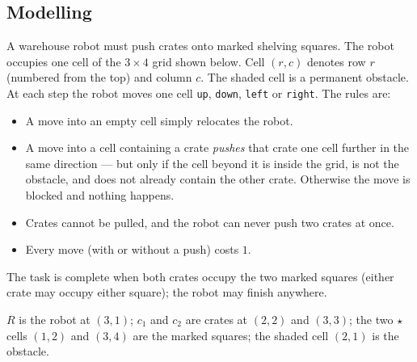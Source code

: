 \subsection{\points[10] Modelling}
A warehouse robot must push crates onto marked shelving squares.
The robot occupies one cell of the $3 \times 4$ grid shown below.
Cell $(r,c)$ denotes row $r$ (numbered from the top) and column $c$.
The shaded cell is a permanent obstacle.
\medskip\noindent
At each step the robot moves one cell \texttt{up}, \texttt{down}, \texttt{left} or \texttt{right}.
The rules are:
\begin{itemize}
  \item A move into an empty cell simply relocates the robot.
  \item A move into a cell containing a crate \emph{pushes} that crate one cell further in the
        same direction --- but only if the cell beyond it is inside the grid, is not the
        obstacle, and does not already contain the other crate. Otherwise the move is blocked
        and nothing happens.
  \item Crates cannot be pulled, and the robot can never push two crates at once.
  \item Every move (with or without a push) costs $1$.
\end{itemize}
\medskip\noindent
The task is complete when both crates occupy the two marked squares (either crate may occupy
either square); the robot may finish anywhere.
\begin{figure}[H]
\centering
{}
\end{figure}
\noindent
$R$ is the robot at $(3,1)$; $c_1$ and $c_2$ are crates at $(2,2)$ and $(3,3)$;
the two $\star$ cells $(1,2)$ and $(3,4)$ are the marked squares; the shaded cell $(2,1)$ is
the obstacle.
